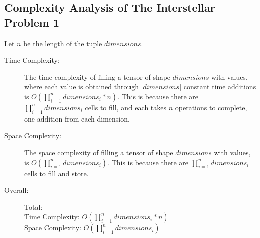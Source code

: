 \subsection{Complexity Analysis of The Interstellar Problem 1}
Let $n$ be the length of the tuple $dimensions$.
\begin{description}
    \item[Time Complexity:]
        The time complexity of filling a tensor of shape $dimensions$ with values,
        where each value is obtained through $|dimensions|$ constant time additions
        is $O(\prod_{i=1}^{n} dimensions_i * n)$. This is because there are $\prod_{i=1}^{n} dimensions_i$ cells to fill, and each takes $n$ operations to complete, one addition from each dimension.
        
    \item[Space Complexity:] 
    The space complexity of filling a tensor of shape $dimensions$ with values,
    is $O(\prod_{i=1}^{n} dimensions_i)$.
    This is because there are $\prod_{i=1}^{n} dimensions_i$ cells to fill and store.
    
    \item[Overall:] Total:\\
        Time Complexity: $O(\prod_{i=1}^{n} dimensions_i * n)$\\
        Space Complexity: $O(\prod_{i=1}^{n} dimensions_i)$

\end{description}


